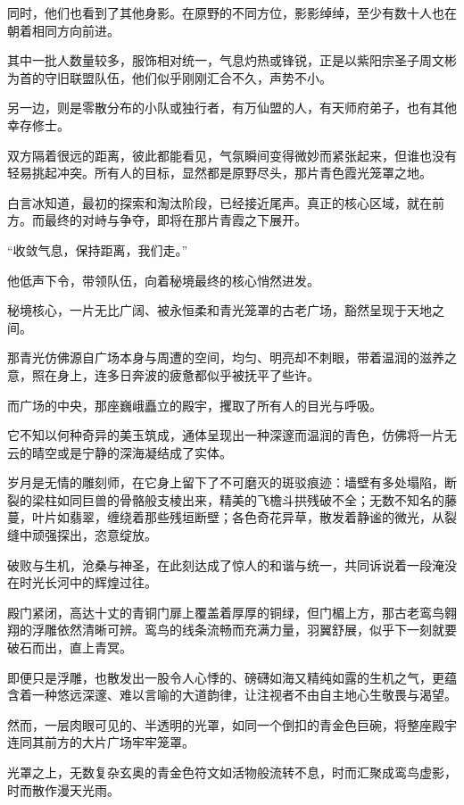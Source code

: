 同时，他们也看到了其他身影。在原野的不同方位，影影绰绰，至少有数十人也在朝着相同方向前进。

其中一批人数量较多，服饰相对统一，气息灼热或锋锐，正是以紫阳宗圣子周文彬为首的守旧联盟队伍，他们似乎刚刚汇合不久，声势不小。

另一边，则是零散分布的小队或独行者，有万仙盟的人，有天师府弟子，也有其他幸存修士。

双方隔着很远的距离，彼此都能看见，气氛瞬间变得微妙而紧张起来，但谁也没有轻易挑起冲突。所有人的目标，显然都是原野尽头，那片青色霞光笼罩之地。

白言冰知道，最初的探索和淘汰阶段，已经接近尾声。真正的核心区域，就在前方。而最终的对峙与争夺，即将在那片青霞之下展开。

“收敛气息，保持距离，我们走。”

他低声下令，带领队伍，向着秘境最终的核心悄然进发。

\vspace{2em}

秘境核心，一片无比广阔、被永恒柔和青光笼罩的古老广场，豁然呈现于天地之间。

那青光仿佛源自广场本身与周遭的空间，均匀、明亮却不刺眼，带着温润的滋养之意，照在身上，连多日奔波的疲惫都似乎被抚平了些许。

而广场的中央，那座巍峨矗立的殿宇，攫取了所有人的目光与呼吸。

它不知以何种奇异的美玉筑成，通体呈现出一种深邃而温润的青色，仿佛将一片无云的晴空或是宁静的深海凝结成了实体。

岁月是无情的雕刻师，在它身上留下了不可磨灭的斑驳痕迹：墙壁有多处塌陷，断裂的梁柱如同巨兽的骨骼般支棱出来，精美的飞檐斗拱残破不全；无数不知名的藤蔓，叶片如翡翠，缠绕着那些残垣断壁；各色奇花异草，散发着静谧的微光，从裂缝中顽强探出，恣意绽放。

破败与生机，沧桑与神圣，在此刻达成了惊人的和谐与统一，共同诉说着一段淹没在时光长河中的辉煌过往。

殿门紧闭，高达十丈的青铜门扉上覆盖着厚厚的铜绿，但门楣上方，那古老鸾鸟翱翔的浮雕依然清晰可辨。鸾鸟的线条流畅而充满力量，羽翼舒展，似乎下一刻就要破石而出，直上青冥。

即便只是浮雕，也散发出一股令人心悸的、磅礴如海又精纯如露的生机之气，更蕴含着一种悠远深邃、难以言喻的大道韵律，让注视者不由自主地心生敬畏与渴望。

然而，一层肉眼可见的、半透明的光罩，如同一个倒扣的青金色巨碗，将整座殿宇连同其前方的大片广场牢牢笼罩。

光罩之上，无数复杂玄奥的青金色符文如活物般流转不息，时而汇聚成鸾鸟虚影，时而散作漫天光雨。

